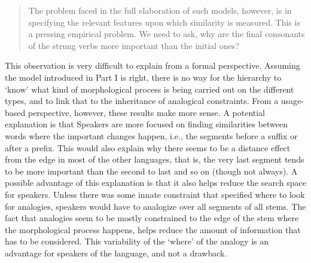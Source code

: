 \begin{quotation}
  The problem faced in the full elaboration of such models, however, is in specifying the relevant features upon which similarity is measured. This is a pressing empirical problem. We need to ask, why are the final consonants of the strung verbs more important than the initial ones? \autocite[p. 62]{Bybee.2010}
\end{quotation}

This observation is very difficult to explain from a formal perspective. Assuming the model introduced in Part I is right, there is no way for the hierarchy to `know' what kind of morphological process is being carried out on the different types, and to link that to the inheritance of analogical constraints. From a usage-based perspective, however, these results make more sense. A potential explanation is that Speakers are more focused on finding similarities between words where the important changes happen, i.e., the segments before a suffix or after a prefix. This would also explain why there seems to be a distance effect from the edge in most of the other languages, that is, the very last segment tends to be more important than the second to last and so on (though not always). A possible advantage of this explanation is that it also helps reduce the search space for speakers. Unless there was some innate constraint that specified where to look for analogies, speakers would have to analogize over all segments of all stems. The fact that analogies seem to be mostly constrained to the edge of the stem where the morphological process happens, helps reduce the amount of information that has to be considered. This variability of the `where' of the analogy is an advantage for speakers of the language, and not a drawback.

